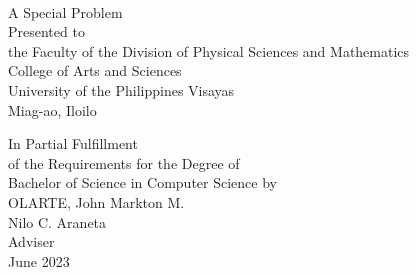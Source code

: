 \begin{titlepage}
\centering

 \\

\vspace{1.5cm}
A Special Problem\\
Presented to\\
the Faculty of the Division of Physical Sciences and Mathematics\\
College of Arts and Sciences\\
University of the Philippines Visayas\\
Miag-ao, Iloilo

\vspace{1.5cm}
In Partial Fulfillment\\
of the Requirements for the Degree of\\
Bachelor of Science in Computer Science
\vspace{1.5cm}
by\\

\vspace{0.5cm}
OLARTE, John Markton M.  \\

\vspace{1.5cm}
Nilo C. Araneta \\
Adviser\\

\vspace{1.5cm}
June 2023
\end{titlepage}
    